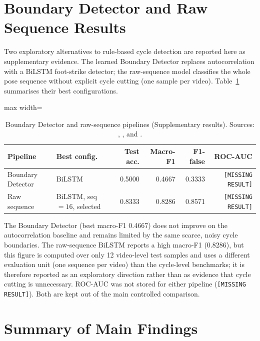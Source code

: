 \section{Boundary Detector and Raw Sequence Results}
\label{sec:bd-raw}

Two exploratory alternatives to rule-based cycle detection are reported here as
supplementary evidence. The learned Boundary Detector replaces autocorrelation
with a BiLSTM foot-strike detector; the raw-sequence model classifies the whole
pose sequence without explicit cycle cutting (one sample per video). Table~\ref{tab:bd-raw} summarises their best configurations.

\begin{table}[htbp]
\centering
\caption[Boundary Detector and raw-sequence pipelines.]{Boundary Detector and raw-sequence pipelines (Supplementary results). Sources: \protect{}, \protect{}, and \protect{}.}
\label{tab:bd-raw}
\tablefont
\begin{adjustbox}{max width=\textwidth}
\begin{tabular}{llrrrr}
\toprule
Pipeline & Best config. & Test acc. & Macro-F1 & F1-false & ROC-AUC \\
\midrule
Boundary Detector & BiLSTM & 0.5000 & 0.4667 & 0.3333 & \texttt{[MISSING RESULT]} \\
Raw sequence & BiLSTM, seq$=16$, selected & 0.8333 & 0.8286 & 0.8571 & \texttt{[MISSING RESULT]} \\
\bottomrule
\end{tabular}
\end{adjustbox}
\end{table}

The Boundary Detector (best macro-F1 0.4667) does not improve on the
autocorrelation baseline and remains limited by the same scarce, noisy cycle
boundaries. The raw-sequence BiLSTM reports a high macro-F1 (0.8286), but this
figure is computed over only 12 video-level test samples and uses a different
evaluation unit (one sequence per video) than the cycle-level benchmarks; it
is therefore reported as an exploratory direction rather than as evidence that
cycle cutting is unnecessary. ROC-AUC was not stored for
either pipeline (\texttt{[MISSING RESULT]}). Both are kept out of the main
controlled comparison.

\section{Summary of Main Findings}
\label{sec:summary}

